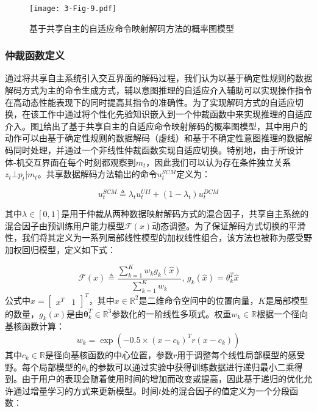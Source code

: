 \begin{figure}[htb]
    \centering
    \texttt{[image: 3-Fig-9.pdf]}
    \caption{基于共享自主的自适应命令映射解码方法的概率图模型}
    \label{3-fig-9}
\end{figure} 

\subsubsection{仲裁函数定义} 
通过将共享自主系统引入交互界面的解码过程，我们认为以基于确定性规则的数据解码方式为主的命令生成方式，辅以意图推理的自适应介入辅助可以实现操作指令在高动态性能表现下的同时提高其指令的准确性。为了实现解码方式的自适应切换，在该工作中通过将个性化先验知识嵌入到一个仲裁函数中来实现推理的自适应介入。图\ref{3-fig-9}给出了基于共享自主的自适应命令映射解码的概率图模型，其中用户的动作可以由基于确定性规则的数据解码（虚线）和基于不确定性意图推理的数据解码同时处理，并通过一个非线性仲裁函数实现自适应切换。特别地，由于所设计体-机交互界面在每个时刻都观察到${m_t}$，因此我们可以认为存在条件独立关系${z_t} \bot {p_t}|{m_t}$。共享数据解码方法输出的命令$u_t^{SCM}$定义为：

\begin{equation}
    \label{ex6}
    u_t^{SCM}\triangleq \lambda_t u_t^{UII}+(1-\lambda_t)u_t^{DCM}
\end{equation}   

其中$\lambda  \in [0,1]$是用于仲裁从两种数据映射解码方式的混合因子，共享自主系统的混合因子由预训练用户能力模型$\mathcal{F}(x)$动态调整。为了保证解码方式切换的平滑性，我们将其定义为一系列局部线性模型的加权线性组合，该方法也被称为感受野加权回归模型\cite{schaalScalableTechniquesNonparametric2002}，定义如下式：

\begin{equation}
    \label{ex7}
    \mathcal{F} (x) \triangleq \frac{{\sum\nolimits_{k = 1}^K {{w_k}{g_k}(\hat x)} }}{{\sum\nolimits_{k = 1}^K {{w_k}} }}{\text{,  }}{g_k}(\hat x) = {\theta}_k^T{\hat x}
\end{equation}   
公式中$\hat x = {[\begin{array}{*{20}{c}}{{x^T}}&1\end{array}]^T}$，其中${x} \in {\mathbb{R}^2}$是二维命令空间中的位置向量，$K$是局部模型的数量，${g_k}(x)$是由${\boldsymbol{\theta }}_k^T \in {\mathbb{R}^{3}}$参数化的一阶线性多项式。权重${w_k\in {\mathbb{R}}}$根据一个径向基核函数计算：
\begin{equation}
    \label{ex8}
    {w_k} = \exp \left( { - 0.5 \times {{(x - {{c}_k})}^T}{{r}}(x - {c_k})} \right)
\end{equation}
其中$c_k \in \mathbb{R}$是径向基核函数的中心位置，参数$r$用于调整每个线性局部模型的感受野。每个局部模型的${\theta }_k$的参数可以通过实验中获得训练数据进行递归最小二乘得到。由于用户的表现会随着使用时间的增加而改变或提高，因此基于递归的优化允许通过增量学习的方式来更新模型。时间$t$处的混合因子的值定义为一个分段函数：


